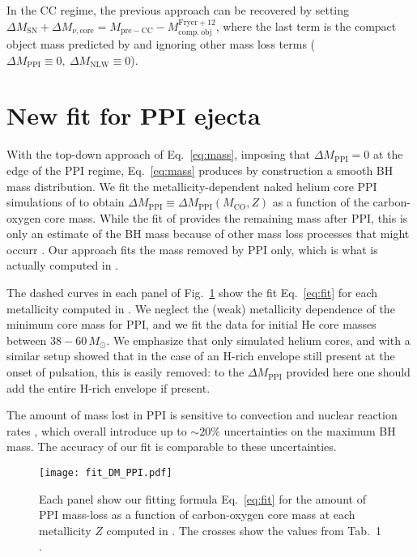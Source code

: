 \documentclass[twocolumn]{aastex63}
\DeclareRobustCommand{\Eqref}[1]{Eq.~\ref{#1}}
\DeclareRobustCommand{\Figref}[1]{Fig.~\ref{#1}}
\begin{document}
In the CC regime, the previous approach can be recovered by setting
$\Delta M_\mathrm{SN} + \Delta M_{\nu, \mathrm{core}} = M_\mathrm{pre-CC} - M_\mathrm{comp.\ obj}^\mathrm{Fryer+12}$,
where the last term is the compact object mass predicted by
\cite{fryer:12} and ignoring other mass loss terms
($\Delta M_\mathrm{PPI}\equiv 0, \ \Delta M_\mathrm{NLW}\equiv0$).

\section{New fit for PPI ejecta}

With the top-down approach of \Eqref{eq:mass}, imposing that
$\Delta M_\mathrm{PPI}=0$ at the edge of the PPI regime,
\Eqref{eq:mass} produces by construction a smooth BH mass
distribution. We fit the metallicity-dependent naked helium core PPI
simulations of \cite{farmer:19} to obtain
$\Delta M_\mathrm{PPI} \equiv \Delta M_\mathrm{PPI}(M_\mathrm{CO},Z)$ as
a function of the carbon-oxygen core mass. While the fit of
\cite{farmer:19} provides the remaining mass after PPI, this is only
an estimate of the BH mass because of other mass loss processes that
might occurr \citep[e.g.,][]{renzo:20csm, powell:21, rahman:22}. Our approach
fits the mass removed by PPI only, which is what is actually computed
in \cite{farmer:19}.


The dashed curves in each panel of \Figref{fig:fit_DM_PPI} show the
fit \Eqref{eq:fit} for each metallicity computed in
\cite{farmer:19}. We neglect the (weak) metallicity dependence of the
minimum core mass for PPI, and we fit the data for initial He core
masses between $38-60\,M_\odot$.  We emphasize that \cite{farmer:19}
only simulated helium cores, and with a similar setup
\cite{renzo:20csm} showed that in the case of an H-rich envelope still
present at the onset of pulsation, this is easily removed: to the
$\Delta M_\mathrm{PPI}$ provided here one should add the entire H-rich
envelope if present.

The amount of mass lost in PPI is sensitive to convection
\cite{renzo:20conv} and nuclear reaction rates \cite{farmer:19,
  farmer:20, costa:21, woosley:21, mehta:21}, which overall introduce
up to $\sim{}20\%$ uncertainties on the maximum BH mass. The accuracy
of our fit is comparable to these uncertainties.

\begin{figure}[ht!]
    \begin{centering}
      \texttt{[image: fit\_DM\_PPI.pdf]}
      \caption{Each panel show our fitting formula \Eqref{eq:fit} for
        the amount of PPI mass-loss as a function of carbon-oxygen
        core mass at each metallicity $Z$ computed in
        \cite{farmer:19}. The crosses show the values from Tab.~1
        \cite{farmer:19}.}
        \label{fig:fit_DM_PPI}
    \end{centering}
\end{figure}


\end{document}

